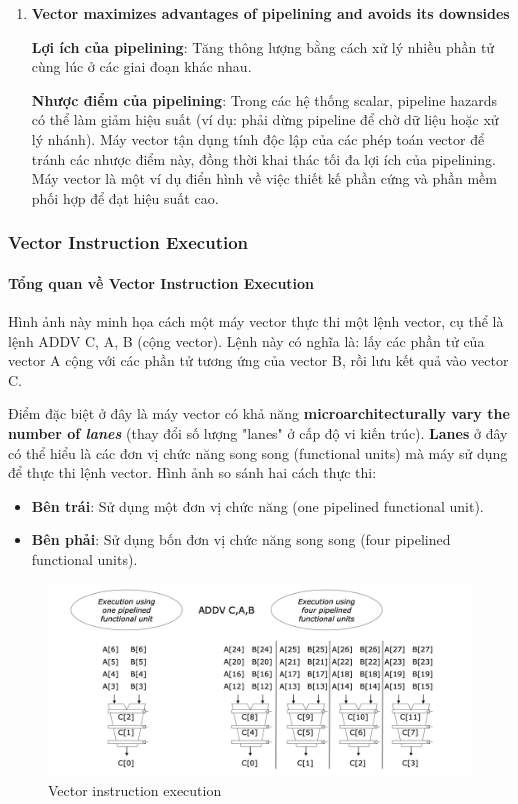 \documentclass[a4paper]{article}
\begin{document}
\begin{enumerate}
    \item \textbf{Vector maximizes advantages of pipelining and avoids its downsides} \par \textbf{Lợi ích của pipelining}: Tăng thông lượng bằng cách xử lý nhiều phần tử cùng lúc ở các giai đoạn khác nhau.
    
    \textbf{Nhược điểm của pipelining}: Trong các hệ thống scalar, pipeline hazards có thể làm giảm hiệu suất (ví dụ: phải dừng pipeline để chờ dữ liệu hoặc xử lý nhánh).
    Máy vector tận dụng tính độc lập của các phép toán vector để tránh các nhược điểm này, đồng thời khai thác tối đa lợi ích của pipelining.	Máy vector là một ví dụ điển hình về việc thiết kế phần cứng và phần mềm phối hợp để đạt hiệu suất cao.
\end{enumerate}

\subsubsection{Vector Instruction Execution}
\paragraph{Tổng quan về Vector Instruction Execution}

Hình ảnh này minh họa cách một máy vector thực thi một lệnh vector, cụ thể là lệnh ADDV C, A, B (cộng vector). Lệnh này có nghĩa là: lấy các phần tử của vector A cộng với các phần tử tương ứng của vector B, rồi lưu kết quả vào vector C.

Điểm đặc biệt ở đây là máy vector có khả năng \textbf{microarchitecturally vary the number of \textit{lanes}} (thay đổi số lượng "lanes" ở cấp độ vi kiến trúc). \textbf{Lanes} ở đây có thể hiểu là các đơn vị chức năng song song (functional units) mà máy sử dụng để thực thi lệnh vector. Hình ảnh so sánh hai cách thực thi:
\begin{itemize}
    \item \textbf{Bên trái}: Sử dụng một đơn vị chức năng (one pipelined functional unit).
    \item \textbf{Bên phải}: Sử dụng bốn đơn vị chức năng song song (four pipelined functional units).
\end{itemize}

\begin{figure}[H]
    \centering
    \includegraphics[width=1\linewidth]{assets/vector-instruction-execution.png}
    \caption{Vector instruction execution}
    \label{fig:enter-label}
\end{figure}
\end{document}
